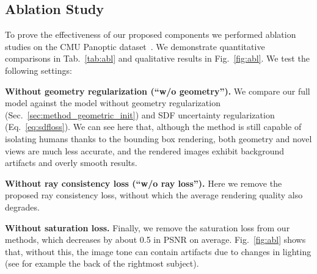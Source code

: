 \subsection{Ablation Study}
\label{sec:results_ablation}

To prove the effectiveness of our proposed components we performed ablation studies on the CMU Panoptic dataset~\cite{Simon_2017_CVPR,Joo_2017_TPAMI}. We demonstrate quantitative comparisons in Tab.~\ref{tab:abl} and qualitative results in Fig.~\ref{fig:abl}. We test the following settings: 

\noindent
\textbf{Without geometry regularization (``w/o geometry'').} We compare our full model against the model without geometry regularization (Sec.~\ref{sec:method_geometric_init}) and SDF uncertainty regularization (Eq.~\ref{eq:sdfloss}). We can see here that, although the method is still capable of isolating humans thanks to the bounding box rendering, both geometry and novel views are much less accurate, and the rendered images exhibit background artifacts and overly smooth results. 

\noindent
\textbf{Without ray consistency loss (``w/o ray loss'').} Here we remove the proposed ray consistency loss, without which the average rendering quality also degrades.

\noindent
\textbf{Without saturation loss.} Finally, we remove the saturation loss from our methods, which decreases by about 0.5 in PSNR on average.  Fig.~\ref{fig:abl} shows that, without this, the image tone can contain artifacts due to changes in lighting (see for example the back of the rightmost subject).


